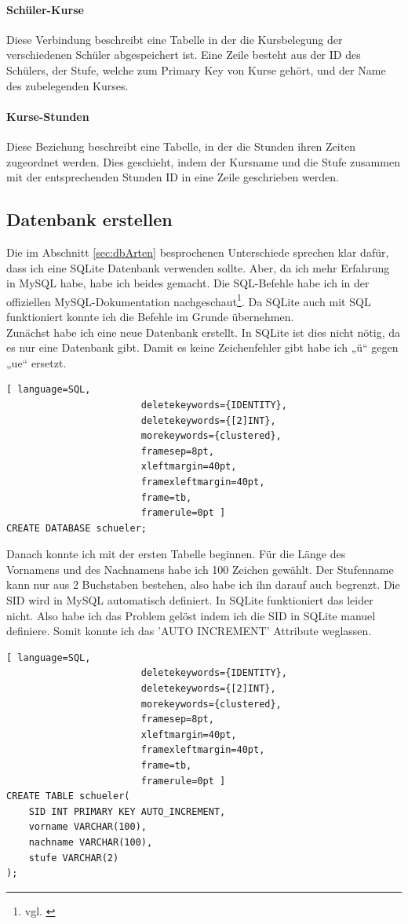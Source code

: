 \documentclass[a4paper, 12pt]{article}
\theoremstyle{plain}
\theoremstyle{definition}
\begin{document}
\paragraph{Schüler-Kurse}
Diese Verbindung beschreibt eine Tabelle in der die Kursbelegung der verschiedenen Schüler abgespeichert ist. Eine Zeile besteht aus der ID des Schülers, der Stufe, welche zum Primary Key von Kurse  gehört, und der Name des zubelegenden Kurses.
\paragraph{Kurse-Stunden}
Diese Beziehung beschreibt eine Tabelle, in der die Stunden ihren Zeiten zugeordnet werden. Dies geschieht, indem der Kursname und die Stufe zusammen mit der entsprechenden Stunden ID in eine Zeile geschrieben werden.

	\subsection{Datenbank erstellen}
	\label{sec:dbErst}
	Die im Abschnitt \ref{sec:dbArten} besprochenen Unterschiede sprechen klar dafür, dass ich eine SQLite Datenbank verwenden sollte. Aber, da ich mehr Erfahrung in MySQL habe, habe ich beides gemacht. Die SQL-Befehle habe ich in der offiziellen MySQL-Dokumentation nachgeschaut\footnote{vgl. \cite{sqlDocu}}. Da SQLite auch mit SQL funktioniert konnte ich die Befehle im Grunde übernehmen. \\ 

Zunächst habe ich eine neue Datenbank erstellt. In SQLite ist dies nicht nötig, da es nur eine Datenbank gibt. Damit es keine Zeichenfehler gibt habe ich „ü“ gegen „ue“ ersetzt.
	\begin{lstlisting}[ language=SQL,
	                    deletekeywords={IDENTITY},
	                    deletekeywords={[2]INT},
	                    morekeywords={clustered},
	                    framesep=8pt,
	                    xleftmargin=40pt,
	                    framexleftmargin=40pt,
	                    frame=tb,
	                    framerule=0pt ]
CREATE DATABASE schueler;\end{lstlisting}
Danach konnte ich mit der ersten Tabelle beginnen. Für die Länge des Vornamens und des Nachnamens habe ich 100 Zeichen gewählt. Der Stufenname kann nur aus 2 Buchstaben bestehen, also habe ich ihn darauf auch begrenzt. Die SID wird in MySQL automatisch definiert. In SQLite funktioniert das leider nicht. Also habe ich das Problem gelöst indem ich die SID in SQLite manuel definiere. Somit konnte ich das 'AUTO INCREMENT' Attribute weglassen.
	\begin{lstlisting}[ language=SQL,
	                    deletekeywords={IDENTITY},
	                    deletekeywords={[2]INT},
	                    morekeywords={clustered},
	                    framesep=8pt,
	                    xleftmargin=40pt,
	                    framexleftmargin=40pt,
	                    frame=tb,
	                    framerule=0pt ]
CREATE TABLE schueler(
	SID INT PRIMARY KEY AUTO_INCREMENT, 
	vorname VARCHAR(100), 
	nachname VARCHAR(100), 
	stufe VARCHAR(2)
);\end{lstlisting}
\end{document}

